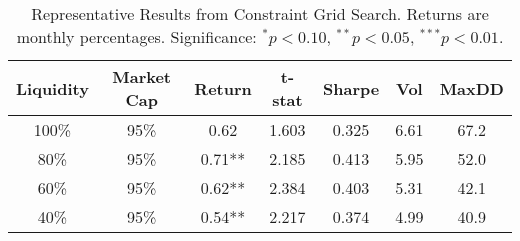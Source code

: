 \begin{table}
\caption{Representative Results from Constraint Grid Search. Returns are monthly percentages. Significance: $^{*}p<0.10$, $^{**}p<0.05$, $^{***}p<0.01$.}
\label{tab:constraints_detailed}
\begin{tabular}{cc|ccccc}
\toprule
Liquidity & Market Cap & Return & t-stat & Sharpe & Vol & MaxDD \\
\midrule
100\% & 95\% & 0.62 & 1.603 & 0.325 & 6.61 & 67.2 \\
80\% & 95\% & 0.71** & 2.185 & 0.413 & 5.95 & 52.0 \\
60\% & 95\% & 0.62** & 2.384 & 0.403 & 5.31 & 42.1 \\
40\% & 95\% & 0.54** & 2.217 & 0.374 & 4.99 & 40.9 \\
\bottomrule
\end{tabular}
\end{table}
